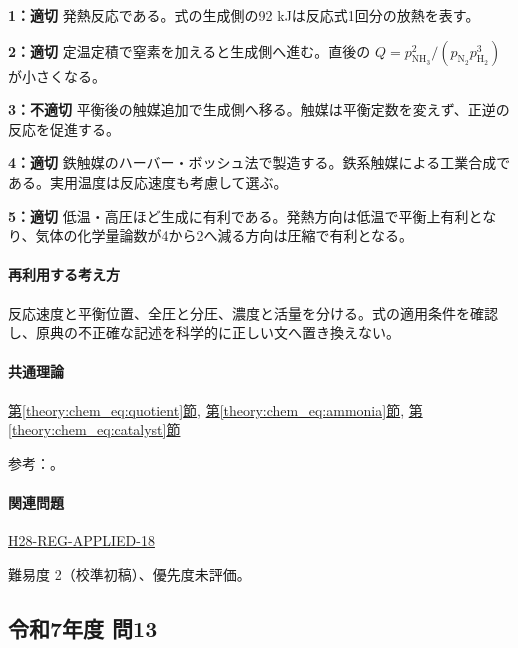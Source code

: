 \noindent\textbf{1：適切} 発熱反応である。式の生成側の92 kJは反応式1回分の放熱を表す。\par

\noindent\textbf{2：適切} 定温定積で窒素を加えると生成側へ進む。直後の \(Q=p_{\mathrm{NH_3}}^2/(p_{\mathrm{N_2}}p_{\mathrm{H_2}}^3)\) が小さくなる。\par

\noindent\textbf{3：不適切} 平衡後の触媒追加で生成側へ移る。触媒は平衡定数を変えず、正逆の反応を促進する。\par

\noindent\textbf{4：適切} 鉄触媒のハーバー・ボッシュ法で製造する。鉄系触媒による工業合成である。実用温度は反応速度も考慮して選ぶ。\par

\noindent\textbf{5：適切} 低温・高圧ほど生成に有利である。発熱方向は低温で平衡上有利となり、気体の化学量論数が4から2へ減る方向は圧縮で有利となる。\par

\paragraph{再利用する考え方} 反応速度と平衡位置、全圧と分圧、濃度と活量を分ける。式の適用条件を確認し、原典の不正確な記述を科学的に正しい文へ置き換えない。

\paragraph{共通理論} \hyperref[theory:chem_eq:quotient]{第\ref*{theory:chem_eq:quotient}節}, \hyperref[theory:chem_eq:ammonia]{第\ref*{theory:chem_eq:ammonia}節}, \hyperref[theory:chem_eq:catalyst]{第\ref*{theory:chem_eq:catalyst}節}

\par 参考：\cite{iupac_greenbook2012}。

\paragraph{関連問題} \hyperref[q:h28-reg-applied-18]{H28-REG-APPLIED-18}

\par 難易度 2（校準初稿）、優先度未評価。

\subsection{令和7年度 問13}
\label{q:r07-reg-applied-13}

